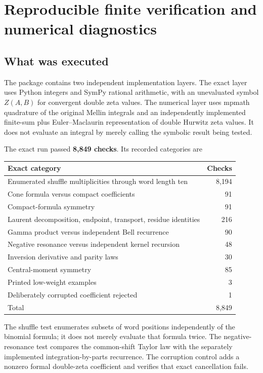 \section{Reproducible finite verification and numerical diagnostics}
\label{bmh:sec:verification}

\subsection{What was executed}
The package contains two independent implementation layers. The exact
layer uses Python integers and SymPy rational arithmetic, with an
unevaluated symbol $Z(A,B)$ for convergent double zeta values. The
numerical layer uses mpmath quadrature of the original Mellin integrals
and an independently implemented finite-sum plus Euler--Maclaurin
representation of double Hurwitz zeta values. It does not evaluate an
integral by merely calling the symbolic result being tested.

The exact run passed \textbf{8,849 checks}. Its recorded categories are
\begin{center}
\begin{tabular}{@{}lr@{}}
\toprule
Exact category & Checks\\
\midrule
Enumerated shuffle multiplicities through word length ten & 8,194\\
Cone formula versus compact coefficients & 91\\
Compact-formula symmetry & 91\\
Laurent decomposition, endpoint, transport, residue identities & 216\\
Gamma product versus independent Bell recurrence & 90\\
Negative resonance versus independent kernel recursion & 48\\
Inversion derivative and parity laws & 30\\
Central-moment symmetry & 85\\
Printed low-weight examples & 3\\
Deliberately corrupted coefficient rejected & 1\\
\midrule
Total & 8,849\\
\bottomrule
\end{tabular}
\end{center}
The shuffle test enumerates subsets of word positions independently of
the binomial formula; it does not merely evaluate that formula twice.
The negative-resonance test compares the common-shift Taylor law with the
separately implemented integration-by-parts recurrence. The corruption
control adds a nonzero formal double-zeta coefficient and verifies that
exact cancellation fails.

